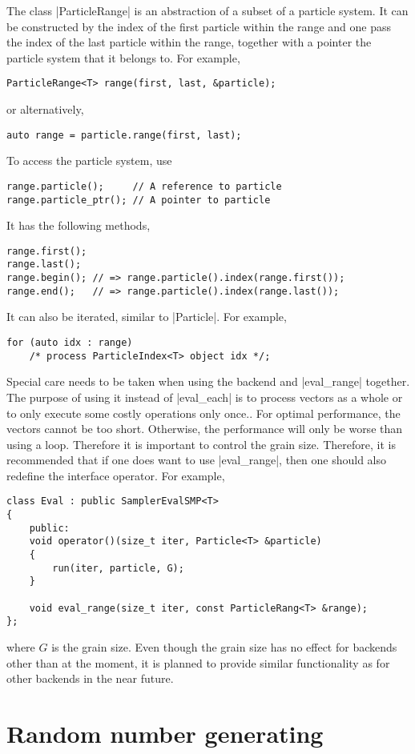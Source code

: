 The class |ParticleRange| is an abstraction of a subset of a particle system.
It can be constructed by the index of the first particle within the range and
one pass the index of the last particle within the range, together with a
pointer the particle system that it belongs to. For example,
\begin{Verbatim}
ParticleRange<T> range(first, last, &particle);
\end{Verbatim}
or alternatively,
\begin{Verbatim}
auto range = particle.range(first, last);
\end{Verbatim}
To access the particle system, use
\begin{Verbatim}
range.particle();     // A reference to particle
range.particle_ptr(); // A pointer to particle
\end{Verbatim}
It has the following methods,
\begin{Verbatim}
range.first();
range.last();
range.begin(); // => range.particle().index(range.first());
range.end();   // => range.particle().index(range.last());
\end{Verbatim}
It can also be iterated, similar to |Particle|. For example,
\begin{Verbatim}
for (auto idx : range)
    /* process ParticleIndex<T> object idx */;
\end{Verbatim}

Special care needs to be taken when using the \tbb backend and |eval_range|
together. The purpose of using it instead of |eval_each| is to process vectors
as a whole or to only execute some costly operations only once.. For optimal
performance, the vectors cannot be too short. Otherwise, the performance will
only be worse than using a loop. Therefore it is important to control the grain
size. Therefore, it is recommended that if one does want to use |eval_range|,
then one should also redefine the interface operator. For example,
\begin{Verbatim}
class Eval : public SamplerEvalSMP<T>
{
    public:
    void operator()(size_t iter, Particle<T> &particle)
    {
        run(iter, particle, G);
    }

    void eval_range(size_t iter, const ParticleRang<T> &range);
};
\end{Verbatim}
where $G$ is the grain size. Even though the grain size has no effect for
backends other than \tbb at the moment, it is planned to provide similar
functionality as \tbb for other backends in the near future.

\section{Random number generating}
\label{sec:Random number generating}

